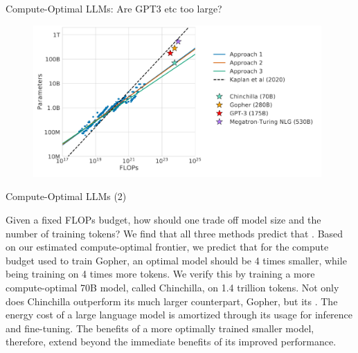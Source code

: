 
\begin{vbframe}{Compute-Optimal LLM\MakeLowercase{s}: Are GPT3 etc too large?}

\vfill

\begin{figure}
	\centering
	\includegraphics[width = 11cm]{./figure/chinchilla.png} \\ 
\end{figure}

\vfill

\end{vbframe}


\begin{vbframe}{Compute-Optimal LLM\MakeLowercase{s} (2)}

Given a fixed FLOPs budget, how should one trade off model size and
the number of training tokens? We find that all three methods predict
that . Based on our estimated
compute-optimal frontier, we predict that for the compute budget used
to train Gopher, an optimal model should be 4 times smaller, while
being training on 4 times more tokens. We verify this by training a more
compute-optimal 70B model, called Chinchilla, on 1.4 trillion tokens.
Not only does Chinchilla outperform its much larger counterpart,
Gopher, but its . The
energy cost of a large language model is amortized through its usage
for inference and fine-tuning. The benefits of a more optimally trained
smaller model, therefore, extend beyond the immediate benefits of its
improved performance.

\end{vbframe}


